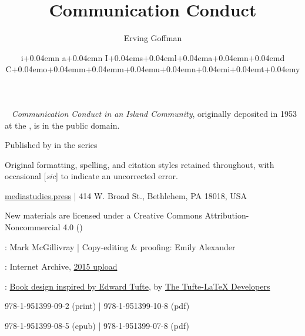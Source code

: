 \documentclass[openany,nobib]{tufte-book}
\title[Communication Conduct in an Island Community]{Communication Conduct}
\date{i\kern+0.04emn a\kern+0.04emn I\kern+0.04ems\kern+0.04eml\kern+0.04ema\kern+0.04emn\kern+0.04emd C\kern+0.04emo\kern+0.04emm\kern+0.04emm\kern+0.04emu\kern+0.04emn\kern+0.04emi\kern+0.04emt\kern+0.04emy}
\author[Erving Goffman]{Erving Goffman}
\begin{document}
\frontmatter{}\setcounter{page}{3}

\begin{fullwidth}


\maketitle


\newpage

~\vfill
\thispagestyle{empty}
\setlength{\parindent}{0pt}
\setlength{\parskip}{\baselineskip}
\emph{Communication Conduct in an Island Community}, originally deposited in 1953 at the , is in the public domain.

\par Published by  in the  series

\par Original formatting, spelling, and citation styles retained throughout, with occasional {[}\emph{sic}{]} to indicate an uncorrected error.

\href{http://mediastudies.press}{mediastudies.press} | 414 W. Broad St., Bethlehem, PA 18018, USA

\par New materials are licensed under a Creative Commons Attribution-Noncommercial 4.0 (\href{https://creativecommons.org/licenses/by-nc/4.0/legalcode}{})

\par {}: Mark McGillivray | Copy-editing \& proofing: Emily Alexander

\par {}: Internet Archive, \href{https://archive.org/details/GOFFMAN1953CommunicationConductInAnIslandCommunity}{2015 upload}

\par {}: \href{https://www.overleaf.com/latex/templates/book-design-inspired-by-edward-tufte/gcfbtdjfqdjh}{Book design inspired by Edward Tufte}, by \href{https://ctan.org/pkg/tufte-latex}{The Tufte-LaTeX Developers}

\par {} 978-1-951399-09-2 (print) |  978-1-951399-10-8 (pdf)

\par {} 978-1-951399-08-5 (epub) |  978-1-951399-07-8 (pdf)


\end{fullwidth}
\end{document}
